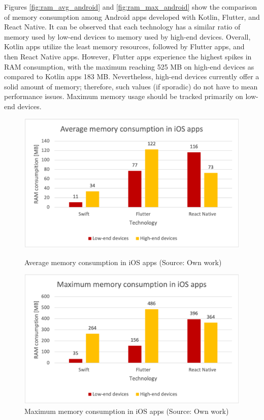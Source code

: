 Figures \ref{fig:ram_avg_android} and \ref{fig:ram_max_android} show the comparison of memory consumption among Android apps developed with Kotlin, Flutter, and React Native. It can be observed that each technology has a similar ratio of memory used by low-end devices to memory used by high-end devices. Overall, Kotlin apps utilize the least memory resources, followed by Flutter apps, and then React Native apps. However, Flutter apps experience the highest spikes in RAM consumption, with the maximum reaching 525 MB on high-end devices as compared to Kotlin apps 183 MB. Nevertheless, high-end devices currently offer a solid amount of memory; therefore, such values (if sporadic) do not have to mean performance issues. Maximum memory usage should be tracked primarily on low-end devices.

\begin{figure}[H]
    \begin{minipage}{.48\textwidth}
        \includegraphics[width=\textwidth]{img/ram_average_ios}
        \caption{Average memory consumption in iOS apps (Source: Own work)}
        \label{fig:ram_avg_ios}
    \end{minipage}
    \hfill
    \begin{minipage}{.48\textwidth}
        \includegraphics[width=\textwidth]{img/ram_max_ios}
        \caption{Maximum memory consumption in iOS apps (Source: Own work)}
        \label{fig:ram_max_ios}
    \end{minipage}
\end{figure}

